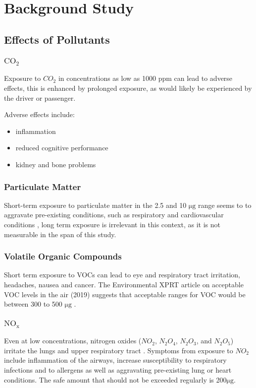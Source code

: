 \chapter{Background Study}


\section{Effects of Pollutants}
\subsection{$\mathrm{CO_2}$}
Exposure to $CO_2$ in concentrations as low as 1000 ppm can lead to adverse effects\cite{healthrisksco2}, this is enhanced by prolonged exposure, as would likely be experienced by the driver or passenger. 

\noindent
Adverse effects include\cite{co2effects}:
\begin{itemize}
	\item inflammation
	\item reduced cognitive performance
	\item kidney and bone problems
\end{itemize}


\subsection{Particulate Matter}
Short-term exposure to particulate matter in the 2.5 and 10 $ \si{\micro\gram} $ range seems to to aggravate pre-existing conditions, such as respiratory and cardiovascular conditions \cite{pmparticles}, long term exposure is irrelevant in this context, as it is not measurable in the span of this study.


\subsection{Volatile Organic Compounds}
Short term exposure to VOCs can lead to eye and respiratory tract irritation, headaches, nausea and cancer\cite{safevocs}.
The Environmental XPRT article on acceptable VOC levels in the air (2019) \cite{vocs} suggests that acceptable ranges for VOC would be between 300 to 500 $ \si{\micro\gram} $ .

\subsection{$\mathrm{NO_x}$}
Even at low concentrations, nitrogen oxides ($NO_2$, $N_{2}O_{4}$, $N_{2}O_{3}$, and $N_{2}O_{5}$) irritate the lungs and upper respiratory tract \cite{cdcitation}.
Symptoms from exposure to $NO_2$ include inflammation of the airways, increase susceptibility to respiratory infections and to allergens as well as aggravating pre-existing lung or heart conditions. The safe amount that should not be exceeded regularly is 200$ \si{\micro\gram} $.\cite{safenox}



